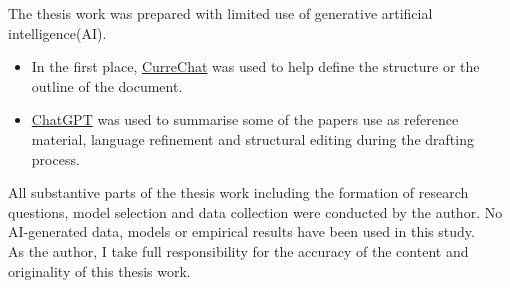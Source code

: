 \documentclass[12pt]{report}
\begin{document}
The thesis work was prepared with limited use of generative artificial intelligence(AI).
\begin{itemize}
    \item In the first place, \href{https://curre.helsinki.fi/chat/general}{CurreChat} was used to help define the structure or the outline of the document.
    \item \href{https://chatgpt.com/}{ChatGPT} was used to summarise some of the papers use as reference material, language refinement and structural editing during the drafting process.
\end{itemize}
All substantive parts of the thesis work including the formation of research questions, model selection and data collection were conducted by the author. No AI-generated data, models or empirical results have been used in this study.\\
As the author, I take full responsibility for the accuracy of the content and originality of this thesis work.
\end{document}
